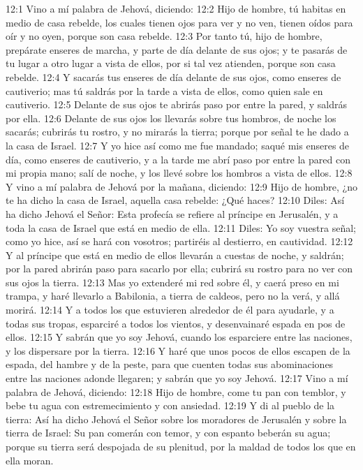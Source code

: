 12:1 Vino a mí palabra de Jehová, diciendo:   
12:2 Hijo de hombre, tú habitas en medio de casa rebelde, los cuales tienen ojos para ver y no ven, tienen oídos para oír y no oyen,  porque son casa rebelde.   
12:3 Por tanto tú, hijo de hombre, prepárate enseres de marcha, y parte de día delante de sus ojos; y te pasarás de tu lugar a otro lugar a vista de ellos, por si tal vez atienden, porque son casa rebelde.   
12:4 Y sacarás tus enseres de día delante de sus ojos, como enseres de cautiverio; mas tú saldrás por la tarde a vista de ellos, como quien sale en cautiverio.   
12:5 Delante de sus ojos te abrirás paso por entre la pared, y saldrás por ella.   
12:6 Delante de sus ojos los llevarás sobre tus hombros, de noche los sacarás; cubrirás tu rostro, y no mirarás la tierra; porque por señal te he dado a la casa de Israel.   
12:7 Y yo hice así como me fue mandado; saqué mis enseres de día, como enseres de cautiverio, y a la tarde me abrí paso por entre la pared con mi propia mano; salí de noche, y los llevé sobre los hombros a vista de ellos.   
12:8 Y vino a mí palabra de Jehová por la mañana, diciendo:   
12:9 Hijo de hombre, ¿no te ha dicho la casa de Israel, aquella casa rebelde: ¿Qué haces?   
12:10 Diles: Así ha dicho Jehová el Señor: Esta profecía se refiere al príncipe en Jerusalén, y a toda la casa de Israel que está en medio de ella.   
12:11 Diles: Yo soy vuestra señal; como yo hice, así se hará con vosotros; partiréis al destierro, en cautividad. 
12:12 Y al príncipe que está en medio de ellos llevarán a cuestas de noche, y saldrán; por la pared abrirán paso para sacarlo por ella; cubrirá su rostro para no ver con sus ojos la tierra.   
12:13 Mas yo extenderé mi red sobre él, y caerá preso en mi trampa, y haré llevarlo a Babilonia, a tierra de caldeos, pero no la verá, y allá morirá.   
12:14 Y a todos los que estuvieren alrededor de él para ayudarle, y a todas sus tropas, esparciré a todos los vientos, y desenvainaré espada en pos de ellos. 
12:15 Y sabrán que yo soy Jehová, cuando los esparciere entre las naciones, y los dispersare por la tierra.   
12:16 Y haré que unos pocos de ellos escapen de la espada, del hambre y de la peste, para que cuenten todas sus abominaciones entre las naciones adonde llegaren; y sabrán que yo soy Jehová.   
12:17 Vino a mí palabra de Jehová, diciendo:   
12:18 Hijo de hombre, come tu pan con temblor, y bebe tu agua con estremecimiento y con ansiedad. 
12:19 Y di al pueblo de la tierra: Así ha dicho Jehová el Señor sobre los moradores de Jerusalén y sobre la tierra de Israel: Su pan comerán con temor, y con espanto beberán su agua; porque su tierra será despojada de su plenitud, por la maldad de todos los que en ella moran.   
